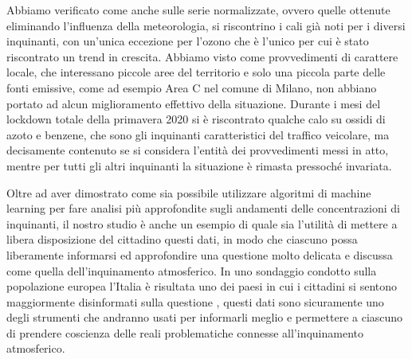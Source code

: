 Abbiamo verificato come anche sulle serie normalizzate, ovvero quelle ottenute eliminando l'influenza della meteorologia, si riscontrino i cali già noti per i diversi inquinanti, con un'unica eccezione per l'ozono che è l'unico per cui è stato riscontrato un trend in crescita. Abbiamo visto come provvedimenti di carattere locale, che interessano piccole aree del territorio e solo una piccola parte delle fonti emissive, come ad esempio Area C nel comune di Milano, non abbiano portato ad alcun miglioramento effettivo della situazione. Durante i mesi del lockdown totale della primavera 2020 si è riscontrato qualche calo su ossidi di azoto e benzene, che sono gli inquinanti caratteristici del traffico veicolare, ma decisamente contenuto se si considera l'entità dei provvedimenti messi in atto, mentre per tutti gli altri inquinanti la situazione è rimasta pressoché invariata.

Oltre ad aver dimostrato come sia possibile utilizzare algoritmi di machine learning per fare analisi più approfondite sugli andamenti delle concentrazioni di inquinanti, il nostro studio è anche un esempio di quale sia l'utilità di mettere a libera disposizione del cittadino questi dati, in modo che ciascuno possa liberamente informarsi ed approfondire una questione molto delicata e discussa come quella dell'inquinamento atmosferico. In uno sondaggio condotto sulla popolazione europea l'Italia è risultata uno dei paesi in cui i cittadini si sentono maggiormente disinformati sulla questione \cite{attitudes2019}, questi dati sono sicuramente uno degli strumenti che andranno usati per informarli meglio e permettere a ciascuno di prendere coscienza delle reali problematiche connesse all'inquinamento atmosferico.





